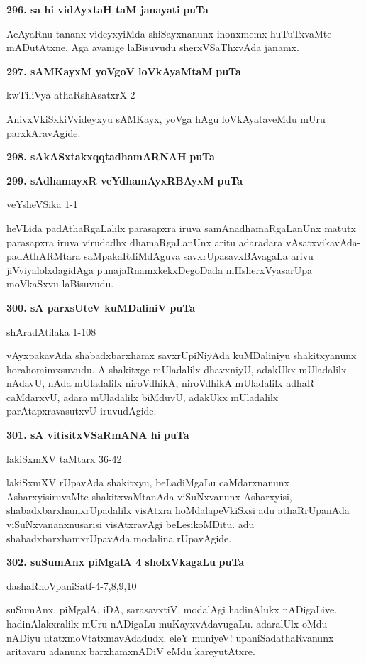 \noindent
\textbf{296. sa hi vidAyxtaH taM janayati} \hfill {\bf puTa \pageref{91b}}

\smallskip
AcAyaRnu tananx videyxyiMda shiSayxnanunx inonxmemx huTuTxvaMte mADutAtxne. Aga avanige laBisuvudu sherxVSaThxvAda janamx.

\medskip
\textbf{297. sAMKayxM yoVgoV loVkAyaMtaM} \hfill {\bf puTa \pageref{89a}}

\hfill kwTiliVya athaRshAsatxrX 2

\smallskip
AnivxVkiSxkiVvideyxyu sAMKayx, yoVga hAgu loVkAyataveMdu mUru parxkAravAgide.

\medskip
\noindent
\textbf{298. sAkASxtakxqqtadhamARNAH} \hfill {\bf puTa \pageref{106}}

\smallskip
\noindent
\textbf{299. sAdhamayxR veYdhamAyxRBAyxM}  \hfill {\bf puTa \pageref{41c}}

\hfill veYsheVSika 1-1

\smallskip
heVLida padAthaRgaLalilx parasapxra iruva samAnadhamaRgaLanUnx matutx parasapxra iruva virudadhx dhamaRgaLanUnx aritu adaradara vAsatxvikavAda-padAthARMtara saMpakaRdiMdAguva savxrUpasavxBAvagaLa arivu jiVviyalolxdagidAga punajaRnamxkekxDegoDada niHsherxVyasarUpa moVkaSxvu laBisuvudu.

\medskip
\noindent
\textbf{300. sA parxsUteV kuMDaliniV} \hfill {\bf puTa \pageref{59}}

\hfill shAradAtilaka 1-108

\smallskip
vAyxpakavAda shabadxbarxhamx savxrUpiNiyAda kuMDaliniyu shakitxyanunx horahomimxsuvudu. A shakitxge mUladalilx dhavxniyU, adakUkx mUladalilx nAdavU, nAda mUladalilx niroVdhikA, niroVdhikA mUladalilx adhaR caMdarxvU, adara mUladalilx biMduvU, adakUkx mUladalilx parAtapxravasutxvU iruvudAgide.

\medskip
\noindent
\textbf{301. sA vitisitxVSaRmANA hi} \hfill {\bf puTa \pageref{157a}}

\hfill lakiSxmXV taMtarx 36-42

\smallskip
lakiSxmXV rUpavAda shakitxyu, beLadiMgaLu caMdarxnanunx AsharxyisiruvaMte shakitxvaMtanAda viSuNxvanunx Asharxyisi, shabadxbarxhamxrUpadalilx visAtxra hoMdalapeVkiSxsi adu athaRrUpanAda viSuNxvananxnusarisi visAtxravAgi beLesikoMDitu. adu shabadxbarxhamxrUpavAda modalina rUpavAgide.

\medskip
\noindent
\textbf{302. suSumAnx piMgalA 4 sholxVkagaLu} \hfill {\bf puTa \pageref{82}}

\hfill dashaRnoVpaniSatf-4-7,8,9,10

\smallskip
suSumAnx, piMgalA, iDA, sarasavxtiV, modalAgi hadinAlukx nADigaLive. hadinAlakxralilx mUru nADigaLu muKayxvAdavugaLu. adaralUlx oMdu nADiyu utatxmoVtatxmavAdadudx. eleY muniyeV! upaniSadathaRvanunx aritavaru adanunx barxhamxnADiV eMdu kareyutAtxre.

